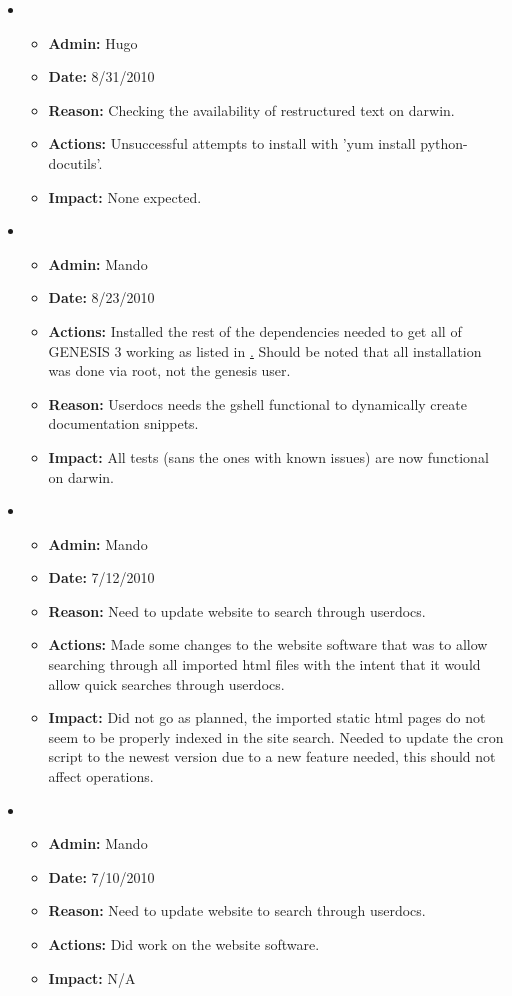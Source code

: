 \documentclass[12pt]{article}
\begin{document}
\begin{itemize}
\item 
\begin{itemize}
\item[] {\bf Admin:} Hugo
\item[] {\bf Date:} 8/31/2010
\item[] {\bf Reason:} Checking the availability of restructured text on darwin.
\item[] {\bf Actions:} Unsuccessful attempts to install with 'yum install python-docutils'.
\item[] {\bf Impact:} None expected.
\end{itemize}

\item 
\begin{itemize}
\item[] {\bf Admin:} Mando
\item[] {\bf Date:} 8/23/2010
\item[] {\bf Actions:} Installed the rest of the dependencies needed to get all of GENESIS 3 working as listed in \href{../installation-fedora12/installation-fedora12.tex}. Should be noted that all installation was done via root, not the genesis user.
\item[] {\bf Reason:} Userdocs needs the gshell functional to dynamically create documentation snippets. 
\item[] {\bf Impact:} All tests (sans the ones with known issues) are now functional on darwin.
\end{itemize}
	
\item 
\begin{itemize}
\item[] {\bf Admin:} Mando
\item[] {\bf Date:} 7/12/2010
\item[] {\bf Reason:} Need to update website to search through userdocs. 
\item[] {\bf Actions:} Made some changes to the website software that was to allow searching through all imported html files with the intent that it would allow quick searches through userdocs.  
\item[] {\bf Impact:} Did not go as planned, the imported static html pages do not seem to be properly indexed in the site search. Needed to update the cron script to the newest version due to a new feature needed, this should not affect operations.
\end{itemize}

\item 
\begin{itemize}
\item[] {\bf Admin:} Mando
\item[] {\bf Date:} 7/10/2010
\item[] {\bf Reason:} Need to update website to search through userdocs. 
\item[] {\bf Actions:} Did work on the website software. 
\item[] {\bf Impact:} N/A
\end{itemize}


\end{itemize}
\end{document}
